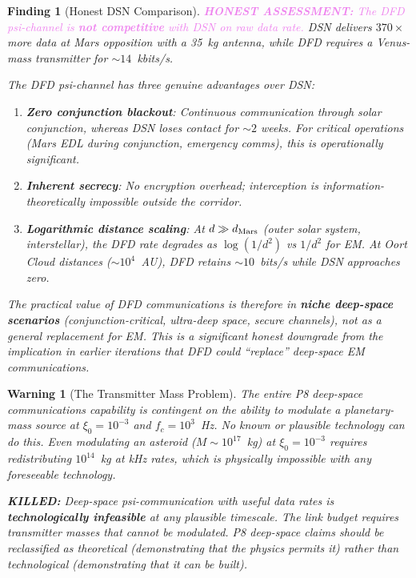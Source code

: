 \documentclass[aps,prd,twocolumn,superscriptaddress,nofootinbib]{revtex4-2}
\newcommand{\honest}[1]{\textcolor{violet}{\textbf{HONEST ASSESSMENT:} #1}}
\newcommand{\killed}[1]{\textcolor{red!70!black}{\textbf{KILLED:} #1}}
\newtheorem{finding}{Finding}
\newtheorem{warning}{Warning}
\begin{document}
\begin{finding}[Honest DSN Comparison]
\label{find:dsn}
\honest{The DFD psi-channel is \textbf{not competitive} with DSN on raw
data rate.} DSN delivers $370\times$ more data at Mars opposition with a
35~kg antenna, while DFD requires a Venus-mass transmitter for
$\sim 14$~kbits/s.

The DFD psi-channel has three genuine advantages over DSN:
\begin{enumerate}
\item \textbf{Zero conjunction blackout}: Continuous communication through
  solar conjunction, whereas DSN loses contact for $\sim 2$ weeks.
  For critical operations (Mars EDL during conjunction, emergency comms),
  this is operationally significant.
\item \textbf{Inherent secrecy}: No encryption overhead; interception
  is information-theoretically impossible outside the corridor.
\item \textbf{Logarithmic distance scaling}: At $d \gg d_{\rm Mars}$
  (outer solar system, interstellar), the DFD rate degrades as
  $\log(1/d^2)$ vs $1/d^2$ for EM. At Oort Cloud distances
  ($\sim 10^4$~AU), DFD retains $\sim 10$~bits/s while DSN approaches
  zero.
\end{enumerate}

The \emph{practical} value of DFD communications is therefore in
\textbf{niche deep-space scenarios} (conjunction-critical, ultra-deep
space, secure channels), not as a general replacement for EM. This is
a significant honest downgrade from the implication in earlier iterations
that DFD could ``replace'' deep-space EM communications.
\end{finding}

\begin{warning}[The Transmitter Mass Problem]
\label{warn:mass}
The entire P8 deep-space communications capability is contingent on
the ability to modulate a planetary-mass source at $\xi_0 = 10^{-3}$
and $f_c = 10^3$~Hz. No known or plausible technology can do this.
Even modulating an asteroid ($M \sim 10^{17}$~kg) at
$\xi_0 = 10^{-3}$ requires redistributing $10^{14}$~kg at kHz rates,
which is physically impossible with any foreseeable technology.

\killed{Deep-space psi-communication with useful data rates is
\textbf{technologically infeasible} at any plausible timescale.
The link budget requires transmitter masses that cannot be modulated.
P8 deep-space claims should be reclassified as \emph{theoretical}
(demonstrating that the physics permits it) rather than
\emph{technological} (demonstrating that it can be built).}
\end{warning}
\end{document}
